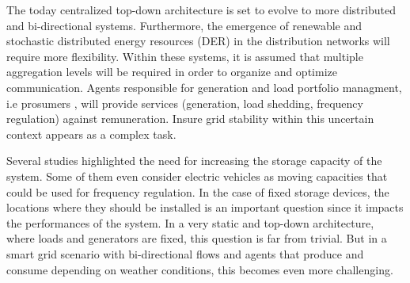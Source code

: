 \documentclass[conference]{IEEEtran}
\begin{document}
The today centralized top-down architecture is set to evolve to more distributed and bi-directional systems. Furthermore, the emergence of renewable and stochastic distributed energy resources (DER) in the distribution networks will require more flexibility. Within these systems, it is assumed that multiple aggregation levels will be required in order to organize and optimize communication. Agents responsible for generation and load portfolio managment, i.e prosumers \cite{Rathnayaka2012}, will provide services (generation, load shedding, frequency regulation) against remuneration. Insure grid stability within this uncertain context appears as a complex task. 

Several studies highlighted the need for increasing the storage capacity of the system. Some of them even consider electric vehicles as moving capacities that could be used for frequency regulation. In the case of fixed storage devices, the locations where they should be installed is an important question since it impacts the performances of the system. In a very static and top-down architecture, where loads and generators are fixed, this question is far from trivial. But in a smart grid scenario with bi-directional flows and agents that produce and consume depending on weather conditions, this becomes even more challenging. 



\end{document}
